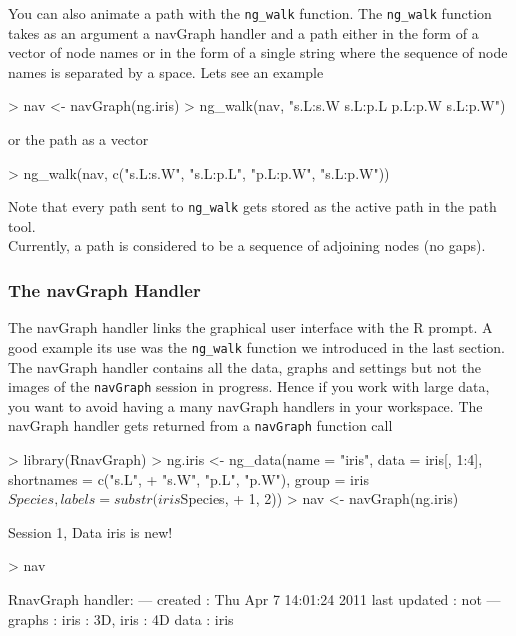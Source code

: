 \documentclass[12pt,oneside,titlepage,letter]{article}
\newcommand{\modify}[1]{{\color{blue}#1}}
\begin{document}
You can also animate a path with the \texttt{ng\_walk} function. The \texttt{ng\_walk} function takes as an argument a navGraph handler and a path either in the form of a vector of node names or in the form of a single string where the sequence of node names is separated by a space. Lets see an example

\begin{Schunk}
\begin{Sinput}
> nav <- navGraph(ng.iris)
> ng_walk(nav, "s.L:s.W s.L:p.L p.L:p.W s.L:p.W")
\end{Sinput}
\end{Schunk}
or the path as a vector
\begin{Schunk}
\begin{Sinput}
> ng_walk(nav, c("s.L:s.W", "s.L:p.L", "p.L:p.W", "s.L:p.W"))
\end{Sinput}
\end{Schunk}
Note that every path sent to \texttt{ng\_walk} gets stored as the active path in the path tool.\\

\modify{Currently, a path is considered to be a sequence of adjoining nodes (no gaps).}

\subsubsection{The navGraph Handler}
The navGraph handler links the graphical user interface with the R prompt. A good example its use was the \texttt{ng\_walk} function we introduced in the last section. The navGraph handler contains all the data, graphs and settings \modify{but not the images} of the \texttt{navGraph} session in progress. Hence if you work with large data, you want to avoid having a many navGraph handlers in your workspace. The navGraph handler gets returned from a \texttt{navGraph} function call
\begin{Schunk}
\begin{Sinput}
> library(RnavGraph)
> ng.iris <- ng_data(name = "iris", data = iris[, 1:4], shortnames = c("s.L", 
+     "s.W", "p.L", "p.W"), group = iris$Species, labels = substr(iris$Species, 
+     1, 2))
> nav <- navGraph(ng.iris)
\end{Sinput}
\begin{Soutput}
Session 1, Data iris is new!
\end{Soutput}
\begin{Sinput}
> nav
\end{Sinput}
\begin{Soutput}
RnavGraph handler:
---
created       : Thu Apr  7 14:01:24 2011 
last updated  : not 
---
graphs        : iris : 3D, iris : 4D 
data          : iris 
\end{Soutput}
\end{Schunk}
\end{document}
